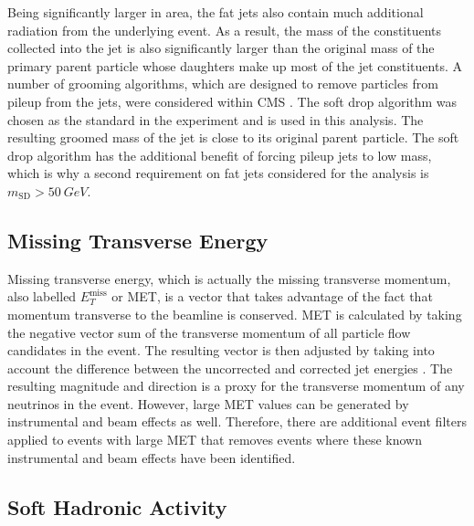 Being significantly larger in area,
the fat jets also contain much additional radiation from the underlying event.
As a result, the mass of the constituents collected into the jet
is also significantly larger than the original mass of the primary parent particle
whose daughters make up most of the jet constituents.
A number of grooming algorithms,
which are designed to remove particles from pileup from the jets,
were considered within CMS \cite{dabercro2014}.
The soft drop algorithm \cite{Larkoski_2014} was chosen as the standard in the experiment
and is used in this analysis.
The resulting groomed mass of the jet is close to its original parent particle.
The soft drop algorithm has the additional benefit of forcing pileup jets to low mass,
which is why a second requirement on fat jets considered for the analysis is
$m_\mathrm{SD} > \SI{50}{GeV}$.

\subsection{Missing Transverse Energy}

Missing transverse energy, which is actually the missing transverse momentum,
also labelled $E_T^\mathrm{miss}$ or MET,
is a vector that takes advantage of the fact that momentum
transverse to the beamline is conserved.
MET is calculated by taking the negative vector sum of the transverse momentum of
all particle flow candidates in the event.
The resulting vector is then adjusted by taking into account the difference
between the uncorrected and corrected jet energies \cite{collaboration_2015}.
The resulting magnitude and direction is a proxy for the transverse momentum of
any neutrinos in the event.
However, large MET values can be generated by instrumental and beam effects as well.
Therefore, there are additional event filters applied to events with large MET
that removes events where these known instrumental and beam effects have been identified.

\subsection{Soft Hadronic Activity}

